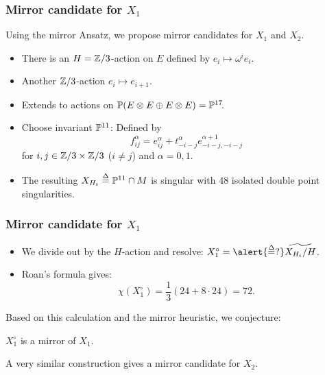 \begin{frame}
\frametitle{Mirror candidate for $X_1$}

Using the mirror Ansatz, we propose mirror candidates for $X_1$ and $X_2$.

\begin{itemize}
	\item
	There is an $H = \Z/3$-action on $E$ defined by $e_i \mapsto \omega^i e_i$.

	\item
	Another $\Z/3$-action $e_i \mapsto e_{i + 1}$.

	\item
	Extends to actions on $\P(E \otimes E \oplus E \otimes E)=\P^{17}\mkern-4mu$.

	\item
	Choose invariant $\P^{11}$: Defined by
	\[
	    f_{ij}^\alpha = e_{ij}^\alpha + t_{-i-j}^\alpha e_{-i-j,-i-j}^{\alpha+1}
	\]
	for $i,j \in \Z/3 \times \Z/3$ ($i \neq j$) and $\alpha = 0,1$.

	\item
	The resulting $X_{H_t} \defeq \P^{11} \cap M$ is singular with $48$ isolated double point singularities.
\end{itemize}

\end{frame}

\begin{frame}
\frametitle{Mirror candidate for $X_1$}

\begin{itemize}
	\item We divide out by the $H$-action and resolve: $X_1^\circ =\alert{\defeq?} \widetilde{X_{H_t}/H}$.
	\item Roan's formula gives:
	\[
	    \chi(X_1^\circ) = \frac{1}{3} (24 + 8 \cdot 24) = 72.
	\]
\end{itemize}

Based on this calculation and the mirror heuristic, we conjecture:

\begin{conjecture}
    $X_1^\circ$ is a mirror of $X_1$.
\end{conjecture}

\begin{remark}
    A very similar construction gives a mirror candidate for $X_2$.
\end{remark}

\end{frame}
